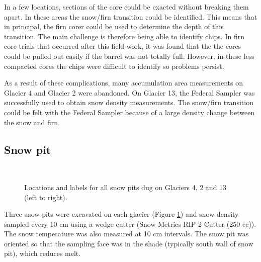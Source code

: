 \documentclass{sfuthesis}
\begin{document}
In a few locations, sections of the core could be exacted without breaking them apart. In these areas the snow/firn transition could be identified. This means that in principal, the firn corer could be used to determine the depth of this transition. The main challenge is therefore being able to identify chips. In firn core trials that occurred after this field work, it was found that the the cores could be pulled out easily if the barrel was not totally full. However, in these less compacted cores the chips were difficult to identify so problems persist. 

As a result of these complications, many accumulation area measurements on Glacier 4 and Glacier 2 were abandoned. On Glacier 13, the Federal Sampler was successfully used to obtain snow density measurements. The snow/firn transition could be felt with the Federal Sampler because of a large density change between the snow and firn.  

\subsection{Snow pit}
\label{sec:snowpit}

\begin{figure}[H]
	\centering
	\\
	\caption{Locations and labels for all snow pits dug on Glaciers 4, 2 and 13 (left to right).}
	\label{fig:snowpit_location_all}
	\end{figure}

Three snow pits were excavated on each glacier (Figure \ref{fig:snowpit_location_all}) and snow density sampled every 10 cm using a wedge cutter (Snow Metrics RIP 2 Cutter (250 cc)). The snow temperature was also measured at 10 cm intervals. The snow pit was oriented so that the sampling face was in the shade (typically south wall of snow pit), which reduces melt. 
\end{document}
